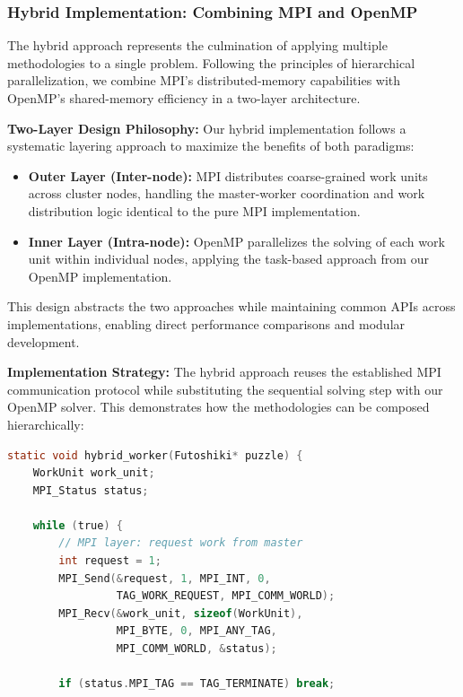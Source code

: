 \begin{enumerate}
\subsubsection{Hybrid Implementation: Combining MPI and OpenMP}
\label{subsubsec:hybrid_implementation}

The hybrid approach represents the culmination of applying multiple methodologies to a single problem. Following the principles of hierarchical parallelization, we combine MPI's distributed-memory capabilities with OpenMP's shared-memory efficiency in a two-layer architecture.

\textbf{Two-Layer Design Philosophy:}
Our hybrid implementation follows a systematic layering approach to maximize the benefits of both paradigms:

\begin{itemize}
    \item \textbf{Outer Layer (Inter-node):} MPI distributes coarse-grained work units across cluster nodes, handling the master-worker coordination and work distribution logic identical to the pure MPI implementation.
    \item \textbf{Inner Layer (Intra-node):} OpenMP parallelizes the solving of each work unit within individual nodes, applying the task-based approach from our OpenMP implementation.
\end{itemize}

This design abstracts the two approaches while maintaining common APIs across implementations, enabling direct performance comparisons and modular development.

\textbf{Implementation Strategy:}
The hybrid approach reuses the established MPI communication protocol while substituting the sequential solving step with our OpenMP solver. This demonstrates how the methodologies can be composed hierarchically:

\begin{lstlisting}[language=C, caption=Hybrid worker combining MPI and OpenMP, label={listing:hybrid_worker}]
static void hybrid_worker(Futoshiki* puzzle) {
    WorkUnit work_unit;
    MPI_Status status;
    
    while (true) {
        // MPI layer: request work from master
        int request = 1;
        MPI_Send(&request, 1, MPI_INT, 0, 
                 TAG_WORK_REQUEST, MPI_COMM_WORLD);
        MPI_Recv(&work_unit, sizeof(WorkUnit), 
                 MPI_BYTE, 0, MPI_ANY_TAG, 
                 MPI_COMM_WORLD, &status);
        
        if (status.MPI_TAG == TAG_TERMINATE) break;
        

\end{lstlisting}
\end{enumerate}
